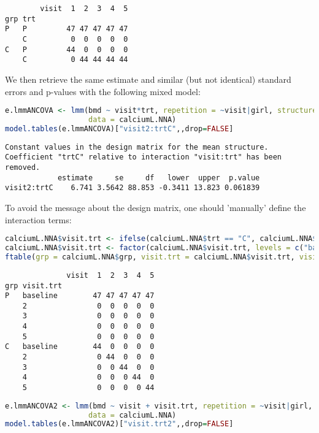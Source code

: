 \documentclass[12pt]{article}
\begin{document}
\label{}
\begin{verbatim}
        visit  1  2  3  4  5
grp trt                     
P   P         47 47 47 47 47
    C          0  0  0  0  0
C   P         44  0  0  0  0
    C          0 44 44 44 44
\end{verbatim}


We then retrieve the same estimate and similar (but not identical)
standard errors and p-values with the following mixed model:
\begin{lstlisting}[language=r,numbers=none]
e.lmmANCOVA <- lmm(bmd ~ visit*trt, repetition = ~visit|girl, structure = UN,
                   data = calciumL.NNA)
model.tables(e.lmmANCOVA)["visit2:trtC",,drop=FALSE]
\end{lstlisting}

\label{}
\begin{verbatim}
Constant values in the design matrix for the mean structure.
Coefficient "trtC" relative to interaction "visit:trt" has been removed.
            estimate     se     df   lower  upper  p.value
visit2:trtC    6.741 3.5642 88.853 -0.3411 13.823 0.061839
\end{verbatim}


\clearpage

To avoid the message about the design matrix, one should 'manually'
define the interaction terms:
\begin{lstlisting}[language=r,numbers=none]
calciumL.NNA$visit.trt <- ifelse(calciumL.NNA$trt == "C", calciumL.NNA$visit, "baseline")
calciumL.NNA$visit.trt <- factor(calciumL.NNA$visit.trt, levels = c("baseline",2:5))
ftable(grp = calciumL.NNA$grp, visit.trt = calciumL.NNA$visit.trt, visit = calciumL.NNA$visit)
\end{lstlisting}

\label{}
\begin{verbatim}
              visit  1  2  3  4  5
grp visit.trt                     
P   baseline        47 47 47 47 47
    2                0  0  0  0  0
    3                0  0  0  0  0
    4                0  0  0  0  0
    5                0  0  0  0  0
C   baseline        44  0  0  0  0
    2                0 44  0  0  0
    3                0  0 44  0  0
    4                0  0  0 44  0
    5                0  0  0  0 44
\end{verbatim}

\begin{lstlisting}[language=r,numbers=none]
e.lmmANCOVA2 <- lmm(bmd ~ visit + visit.trt, repetition = ~visit|girl, structure = UN,
                   data = calciumL.NNA)
model.tables(e.lmmANCOVA2)["visit.trt2",,drop=FALSE]
\end{lstlisting}
\end{document}
